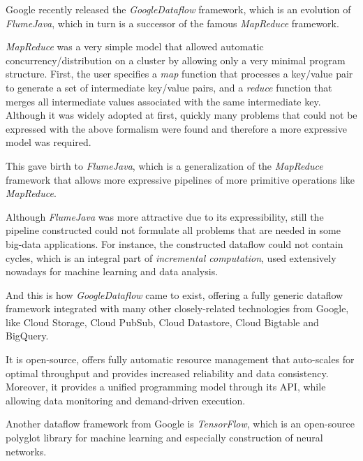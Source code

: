 \documentclass{dithesis}
\begin{document}

Google recently released the \textit{GoogleDataflow }framework, which is an evolution of \textit{FlumeJava}\cite{flumejava}, which in turn is a successor of the famous \textit{MapReduce }framework\cite{mapreduce}.

\textit{MapReduce} was a very simple model that allowed automatic concurrency/distribution on a cluster by allowing only a very minimal program structure. First, the user specifies a \textit{map} function that processes a key/value pair to generate a set of intermediate key/value pairs, and a \textit{reduce} function that merges all intermediate values associated with the same intermediate key. Although it was widely adopted at first, quickly many problems that could not be expressed with the above formalism were found and therefore a more expressive model was required.

This gave birth to \textit{FlumeJava}, which is a generalization of the \textit{MapReduce} framework that allows more expressive pipelines of more primitive operations like \textit{MapReduce}.

Although \textit{FlumeJava} was more attractive due to its expressibility, still the pipeline constructed could not formulate all problems that are needed in some big-data applications. For instance, the constructed dataflow could not contain cycles, which is an integral part of \textit{incremental computation}, used extensively nowadays for machine learning and data analysis.

And this is how \textit{GoogleDataflow} came to exist, offering a fully generic dataflow framework integrated with many other closely-related technologies from Google, like Cloud Storage, Cloud PubSub, Cloud Datastore, Cloud Bigtable and BigQuery. 

It is open-source, offers fully automatic resource management that auto-scales for optimal throughput and provides increased reliability and data consistency. Moreover, it provides a unified programming model through its API, while allowing data monitoring and demand-driven execution.


Another dataflow framework from Google is \textit{TensorFlow}, which is an open-source polyglot library for machine learning and especially construction of neural networks.
\end{document}
